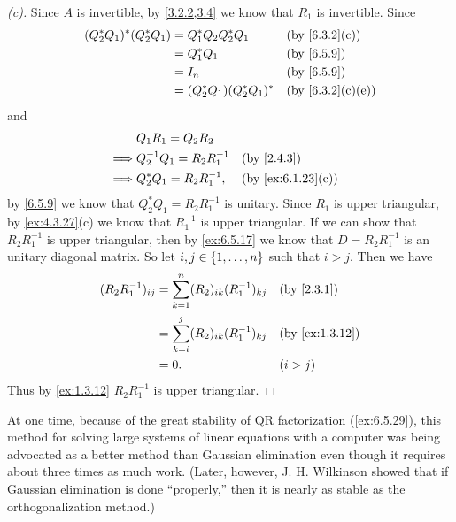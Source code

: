 \begin{proof}[(c)]
  Since \(A\) is invertible, by \cref{3.2.2,3.4} we know that \(R_1\) is invertible.
  Since
  \begin{align*}
    (Q_2^* Q_1)^* (Q_2^* Q_1) & = Q_1^* Q_2 Q_2^* Q_1       &  & \by{6.3.2}[c]   \\
                              & = Q_1^* Q_1                 &  & \by{6.5.9}      \\
                              & = I_n                       &  & \by{6.5.9}      \\
                              & = (Q_2^* Q_1) (Q_2^* Q_1)^* &  & \by{6.3.2}[c,e]
  \end{align*}
  and
  \begin{align*}
             & Q_1 R_1 = Q_2 R_2                                  \\
    \implies & Q_2^{-1} Q_1 = R_2 R_1^{-1} &  & \by{2.4.3}        \\
    \implies & Q_2^* Q_1 = R_2 R_1^{-1},   &  & \by{ex:6.1.23}[c]
  \end{align*}
  by \cref{6.5.9} we know that \(Q_2^* Q_1 = R_2 R_1^{-1}\) is unitary.
  Since \(R_1\) is upper triangular, by \cref{ex:4.3.27}(c) we know that \(R_1^{-1}\) is upper triangular.
  If we can show that \(R_2 R_1^{-1}\) is upper triangular, then by \cref{ex:6.5.17} we know that \(D = R_2 R_1^{-1}\) is an unitary diagonal matrix.
  So let \(i, j \in \left\lbrace1, \dots, n\right\rbrace\) such that \(i > j\).
  Then we have
  \begin{align*}
    (R_2 R_1^{-1})_{i j} & = \sum_{k = 1}^n (R_2)_{i k} (R_1^{-1})_{k j} &  & \by{2.3.1}     \\
                         & = \sum_{k = i}^j (R_2)_{i k} (R_1^{-1})_{k j} &  & \by{ex:1.3.12} \\
                         & = 0.                                          &  & (i > j)
  \end{align*}
  Thus by \cref{ex:1.3.12} \(R_2 R_1^{-1}\) is upper triangular.
\end{proof}

\begin{note}
  At one time, because of the great stability of QR factorization (\cref{ex:6.5.29}), this method for solving large systems of linear equations with a computer was being advocated as a better method than Gaussian elimination even though it requires about three times as much work.
  (Later, however, J. H. Wilkinson showed that if Gaussian elimination is done ``properly,'' then it is nearly as stable as the orthogonalization method.)
\end{note}

